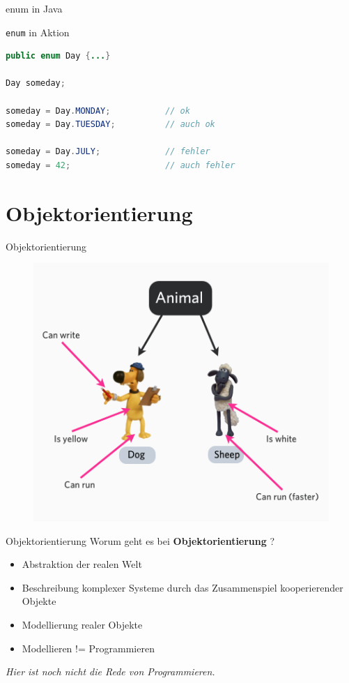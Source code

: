 \documentclass[18pt]{beamer}
\begin{document}
\begin{frame}[fragile]{enum in Java}
    \begin{exampleblock}{\texttt{enum} in Aktion}
        \begin{lstlisting}[language=Java]
public enum Day {...}

Day someday;

someday = Day.MONDAY;           // ok
someday = Day.TUESDAY;          // auch ok

someday = Day.JULY;             // fehler
someday = 42;                   // auch fehler
        \end{lstlisting}


    \end{exampleblock}

\end{frame}

\section{Objektorientierung}

\begin{frame}{Objektorientierung}
    \begin{figure}
        \includegraphics[scale=0.4]{img/animalclass.png}
    \end{figure}
\end{frame}

\begin{frame}{Objektorientierung}
    Worum geht es bei \textbf{Objektorientierung} ?
    \begin{itemize}
        \item Abstraktion der realen Welt
        \item Beschreibung komplexer Systeme durch das Zusammenspiel kooperierender Objekte
        \item Modellierung realer Objekte
        \item Modellieren != Programmieren
    \end{itemize}
    \textit{Hier ist noch nicht die Rede von Programmieren.}
\end{frame}
\end{document}
